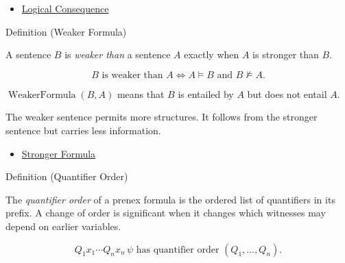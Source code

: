 \begin{dependencies}
\begin{itemize}
  \item \hyperref[def:log-consequence]{Logical Consequence}
\end{itemize}
\end{dependencies}

\begin{definitionbox}{Definition (Weaker Formula)}
\begin{definition}
\label{def:weaker-formula}
A sentence \(B\) is \emph{weaker than} a sentence \(A\) exactly when \(A\) is
stronger than \(B\).
\end{definition}
\end{definitionbox}

\begin{remark*}
\[
B \text{ is weaker than } A
\Longleftrightarrow
A\models B
\text{ and }
B\not\models A.
\]
\end{remark*}

\begin{remark*}
\(\operatorname{WeakerFormula}(B,A)\) means that \(B\) is entailed by \(A\) but
does not entail \(A\).
\end{remark*}

\begin{remark*}[Interpretation]
The weaker sentence permits more structures. It follows from the stronger
sentence but carries less information.
\end{remark*}

\begin{dependencies}
\begin{itemize}
  \item \hyperref[def:strength]{Stronger Formula}
\end{itemize}
\end{dependencies}

\begin{definitionbox}{Definition (Quantifier Order)}
\begin{definition}
\label{def:q-alt}
The \emph{quantifier order} of a prenex formula is the ordered list of
quantifiers in its prefix. A change of order is significant when it changes
which witnesses may depend on earlier variables.
\end{definition}
\end{definitionbox}

\begin{remark*}
\[
Q_1x_1\cdots Q_nx_n\,\psi
\text{ has quantifier order }
(Q_1,\ldots,Q_n).
\]
\end{remark*}

